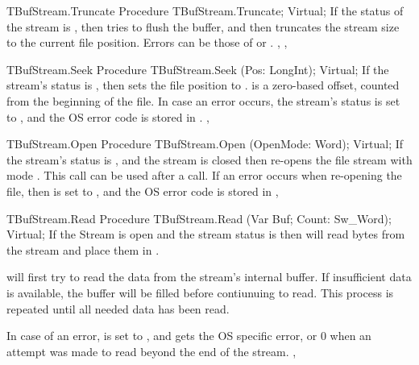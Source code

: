 \begin{procedure}{TBufStream.Truncate}
\Declaration
Procedure TBufStream.Truncate; Virtual;
\Description
If the status of the stream is , then  tries to
flush the buffer, and then truncates the stream size to the current 
file position.
\Errors
Errors can be those of  or
.
\SeeAlso
{}, ,
\end{procedure}

\begin{procedure}{TBufStream.Seek}
\Declaration
Procedure TBufStream.Seek (Pos: LongInt); Virtual;
\Description
If the stream's status is , then  sets the 
file position to .  is a zero-based offset, counted from
the beginning of the file.
\Errors
In case an error occurs, the stream's status is set to ,
and the OS error code is stored in .
\SeeAlso
{}, 
\end{procedure}

\begin{procedure}{TBufStream.Open}
\Declaration
Procedure TBufStream.Open (OpenMode: Word); Virtual;
\Description
If the stream's status is , and the stream is closed then
 re-opens the file stream with mode .
This call can be used after a  call.
\Errors
If an error occurs when re-opening the file, then  is set
to , and the OS error code is stored in 
\SeeAlso
{}, 
\end{procedure}

\begin{procedure}{TBufStream.Read}
\Declaration
Procedure TBufStream.Read (Var Buf; Count: Sw\_Word); Virtual;
\Description
If the Stream is open and the stream status is  then 
 will read  bytes from the stream and place them
in  .

 will first try to read the data from the stream's internal
buffer. If insufficient data is available, the buffer will be filled before
contiunuing to read. This process is repeated until all needed data 
has been read.

\Errors
In case of an error,  is set to , and
 gets the OS specific error, or 0 when an attempt was
made to read beyond the end of the stream.
\SeeAlso
{}, 
\end{procedure}

